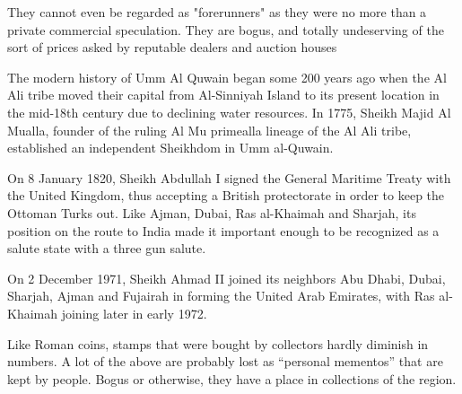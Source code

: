 \documentclass{book}      %
\newcommand{\ph}[3][1]{%
 \begin{figure}[htbp]
   \texttt{[image: \#2]}
   \caption{#3}
 \end{figure}}
\begin{document}
They cannot even be regarded as "forerunners" as they were no more than a private commercial speculation. They are bogus, and totally undeserving of the sort of prices asked by reputable dealers and auction houses


The modern history of Umm Al Quwain began some 200 years ago when the Al Ali tribe moved their capital from Al-Sinniyah Island to its present location in the mid-18th century due to declining water resources. In 1775, Sheikh Majid Al Mualla, founder of the ruling Al Mu primealla lineage of the Al Ali tribe, established an independent Sheikhdom in Umm al-Quwain.

On 8 January 1820, Sheikh Abdullah I signed the General Maritime Treaty with the United Kingdom, thus accepting a British protectorate in order to keep the Ottoman Turks out. Like Ajman, Dubai, Ras al-Khaimah and Sharjah, its position on the route to India made it important enough to be recognized as a salute state with a three gun salute.

On 2 December 1971, Sheikh Ahmad II joined its neighbors Abu Dhabi, Dubai, Sharjah, Ajman and Fujairah in forming the United Arab Emirates, with Ras al-Khaimah joining later in early 1972.

Like Roman coins, stamps that were bought by collectors hardly diminish in numbers. A lot of the above are probably lost as ``personal mementos'' that are kept by people. Bogus or otherwise, they have a place in collections of the region.          
\end{document}
